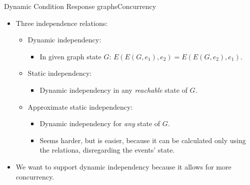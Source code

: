 \documentclass{beamer}
\begin{document}
\begin{frame}{Dynamic Condition Response graphs}{Concurrency}
	\begin{itemize}
  	\item Three independence relations:
  	\begin{itemize}
  		\item Dynamic independency:
  		\begin{itemize}
  			\item In given graph state $G$: $E(E(G, e_1),e_2)=E(E(G, e_2),e_1)$.
  		\end{itemize}

			\vfill

  		\item Static independency:
  		\begin{itemize}
  			\item Dynamic independency in any \textit{reachable} state of $G$.
  		\end{itemize}

			\vfill

			\item Approximate static independency:
			\begin{itemize}
			 	\item Dynamic independency for \textit{any} state of $G$.
			 	\item Seems harder, but is easier, because it can be calculated only using the relationa, disregarding the events' state.
			\end{itemize}
  	\end{itemize}

			\vfill

		\item We want to support dynamic independency because it allows for more concurrency.
  \end{itemize}
\end{frame}
\end{document}
